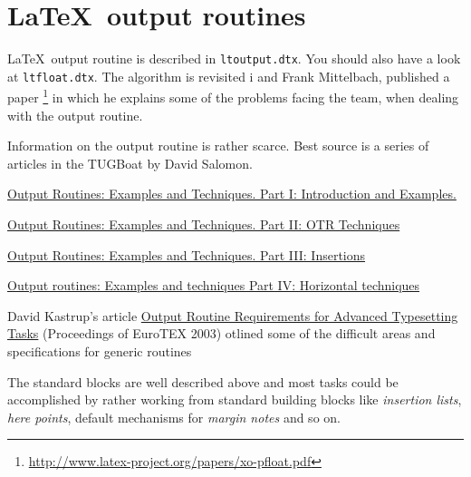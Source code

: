 \section{\LaTeX\  output routines}


\LaTeX\ output routine is described in \texttt{ltoutput.dtx}. You should also have a look at \texttt{ltfloat.dtx}. The algorithm is revisited i  and Frank Mittelbach, published a paper
\footnote{\protect\url{http://www.latex-project.org/papers/xo-pfloat.pdf}} in which he explains some of the problems facing the team, when dealing with the output routine.


Information on the output routine is rather scarce. Best source is a series of  articles in the TUGBoat by David Salomon.

\href{http://www.tug.org/TUGboat/Articles/tb11-1/tb27salomon.pdf}{Output Routines: Examples and Techniques. Part I: Introduction and Examples.}

\href{http://www.tug.org/TUGboat/Articles/tb11-2/tb28salomon.pdf}{Output Routines: Examples and Techniques. Part II: OTR Techniques}

\href{http://www.tug.org/TUGboat/Articles/tb11-4/tb30salomon.pdf}{Output Routines: Examples and Techniques. 
Part III: Insertions}

\href{http://www.tug.org/TUGboat/Articles/tb15-1/tb42salomon-output.pdf}{Output routines: Examples and techniques Part IV: Horizontal techniques}


David Kastrup's article \href{http://www.tug.org/TUGboat/Articles/tb24-3/kastrup.pdf}{Output Routine Requirements for Advanced Typesetting Tasks} (Proceedings of EuroTEX 2003) otlined some of the difficult areas and specifications for generic routines

The standard blocks are well described above and most tasks could be accomplished 
by rather working from
standard building blocks like \textit{insertion lists}, \textit{here points},
default mechanisms for \textit{margin notes} and so on.


